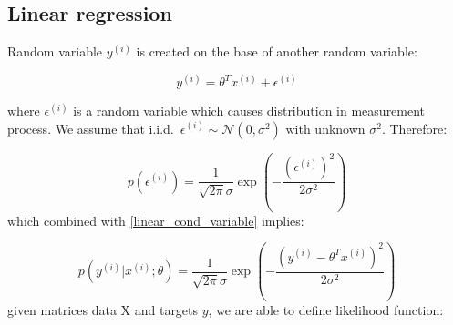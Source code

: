 \begin{comment}
\subsection{Perceptron}
Perceptron can be defined as a step function on dot product $z = \theta^T x$:
\[
 g(z) =
  \begin{cases} 
      0 \hfill & z < 0 \\
      1 \hfill & z \geq 0 \\
  \end{cases}
\]

If we put $h_\theta(x)=g(\theta^Tx)$ as our hypothesis then we can define perceptron learning rule as:

\begin{equation}
	\theta \equiv \theta + \alpha(y^{(i)}-h_\theta(x^{(i)}))x^{(i)} 
\end{equation}

However perceptron is very difficult to handle in terms of probability or maximum likelihood estimator (\textcite{ng_cs229_2000}). We will focus more on linear and especially on logistic regression: 

\end{comment}

\subsection{Linear regression}
Random variable $y^{(i)}$ is created on the base of another random variable:

\begin{equation}
	y^{(i)}=\theta^Tx^{(i)} + \epsilon^{(i)}
	\label{linear_cond_variable}
\end{equation}

\newcommand\iid{i.i.d.}
\newcommand\pN{\mathcal{N}}
where $\epsilon^{(i)}$ is a random variable which causes distribution in measurement process. We assume that \iid~$\epsilon^{(i)} \sim \pN(0, \sigma^2)$ with unknown $\sigma^2$. Therefore:

\begin{equation}
	p(\epsilon^{(i)}) = \frac {1}{\sqrt{2\pi}\sigma}\exp\left(- \frac{(\epsilon^{(i)})^2}{2\sigma^2} \right) 
\end{equation}
which combined with \eqref{linear_cond_variable} implies:

\begin{equation}
	p(y^{(i)}|x^{(i)};\theta) = \frac {1}{\sqrt{2\pi}\sigma}\exp\left(- \frac{(y^{(i)}-\theta^Tx^{(i)})^2}{2\sigma^2} \right) 
\end{equation}
given matrices data X and targets $y$, we are able to define likelihood function:

